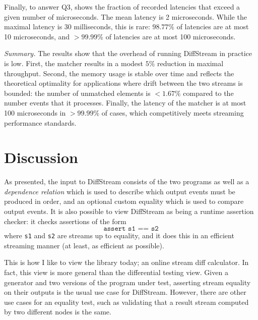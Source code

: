 Finally, to answer Q3,
 shows the fraction of recorded latencies
that exceed a given number of microseconds.
The mean latency is 2 microseconds.
While the maximal latency is 30 milliseconds, this is rare:
$98.77\%$ of latencies
are at most 10 microseconds, and $>99.99\%$ of latencies are at most
100 microseconds.

\emph{Summary.} The results show that the overhead of running DiffStream in practice is low.
First, the matcher results in a modest $5\%$ reduction in maximal throughput.
Second, the memory usage is stable over time and reflects the theoretical optimality for applications where drift between the two streams is bounded:
the number of unmatched elements is $<1.67\%$ compared to the number events that it processes.
Finally, the latency of the matcher is at most 100 microseconds in $>99.99\%$ of cases, which competitively meets streaming performance standards.

\section{Discussion}
\label{diffstream:sec:conclusion}

As presented, the input to DiffStream consists of the two programs as well as
a \emph{dependence relation} which is used to describe which output
events must be produced in order, and an optional custom equality
which is used to compare output events.
It is also possible to view DiffStream as being a runtime assertion checker: it checks assertions of the form
\[
\texttt{assert s1 == s2}
\]
where \texttt{s1} and \texttt{s2} are streams up to equality, and it does this in an efficient streaming manner (at least, as efficient as possible).

This is how I like to view the library today; an online stream diff calculator. In fact, this view is more general than the differential testing view. Given a generator and two versions of the program under test, asserting stream equality on their outputs is the usual use case for DiffStream. However, there are other use cases for an equality test, such as validating that a result stream computed by two different nodes is the same.

